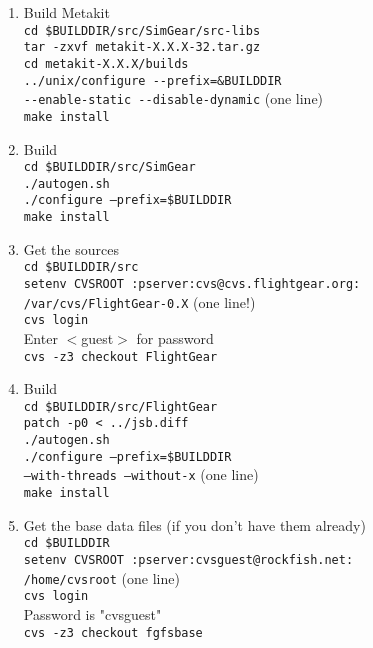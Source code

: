 \begin{enumerate}
\item Build Metakit\\
 \texttt{cd {\$}BUILDDIR/src/SimGear/src-libs}\\
 \texttt{tar -zxvf metakit-X.X.X-32.tar.gz}\\
 \texttt{cd metakit-X.X.X/builds}\\
 \texttt{../unix/configure -$ $-prefix=\&BUILDDIR}\\
 \texttt{-$ $-enable-static -$ $-disable-dynamic} (one line)\\
 \texttt{make install}\\
 
\item Build \SimGear{}\\
 \texttt{cd {\$}BUILDDIR/src/SimGear}\\
 \texttt{./autogen.sh}\\
 \texttt{./configure --prefix={\$}BUILDDIR}\\
 \texttt{make install}\\
 
\item Get the \FlightGear{} sources\\
 \texttt{cd {\$}BUILDDIR/src}\\
 \texttt{setenv CVSROOT :pserver:cvs@cvs.flightgear.org:}\\
 \texttt{/var/cvs/FlightGear-0.X} (one line!)\\
 \texttt{cvs login}\\
 Enter $<$guest$>$ for password\\
 \texttt{cvs -z3 checkout FlightGear}

\item  Build \FlightGear{}\\
 \texttt{cd {\$}BUILDDIR/src/FlightGear}\\
 \texttt{patch -p0 < ../jsb.diff}\\ 
 \texttt{./autogen.sh}\\
 \texttt{./configure --prefix={\$}BUILDDIR }\\
 \texttt{--with-threads --without-x} (one line)\\
 \texttt{make install}
 
\item Get the base data files (if you don't have them already)\\
 \texttt{cd {\$}BUILDDIR}\\
 \texttt{setenv CVSROOT :pserver:cvsguest@rockfish.net:}\\
 \texttt{/home/cvsroot} (one line)\\
 \texttt{cvs login}\\
 Password is "cvsguest"\\
 \texttt{cvs -z3 checkout fgfsbase}


\end{enumerate}
